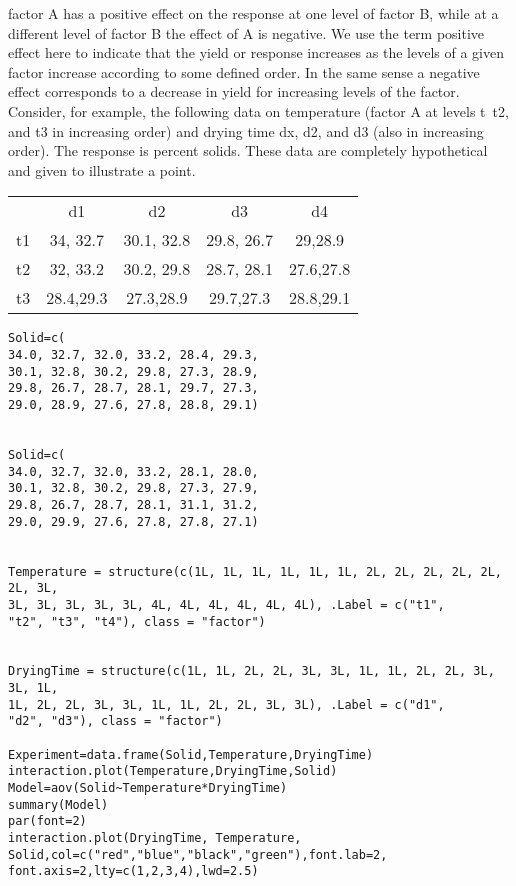 \documentclass{article}
\begin{document}
factor A has a positive effect on the
response at one level of factor B, while at a different level of factor B the effect of
A is negative. We use the term positive effect here to indicate that the yield or
response increases as the levels of a given factor increase according to some defined
order. In the same sense a negative effect corresponds to a decrease in yield for
increasing levels of the factor.
Consider, for example, the following data on temperature (factor A at levels t\,
t2, and t3 in increasing order) and drying time dx, d2, and d3 (also in increasing
order). The response is percent solids. These data are completely hypothetical
and given to illustrate a point.

\begin{tabular}{|c|c|c|c|c|}
\hline

& d1 &	d2	&	d3	& d4	 \\
t1 & 34, 32.7 &	30.1, 32.8	&	29.8, 26.7	&	29,28.9	 \\
t2 & 32, 33.2 &	30.2, 29.8	&	28.7, 28.1	&	27.6,27.8	\\
t3 & 28.4,29.3	&	27.3,28.9	&	29.7,27.3	&	28.8,29.1	\\

\hline 
\end{tabular} 

\begin{verbatim}
Solid=c(
34.0, 32.7, 32.0, 33.2, 28.4, 29.3, 
30.1, 32.8, 30.2, 29.8, 27.3, 28.9, 
29.8, 26.7, 28.7, 28.1, 29.7, 27.3, 
29.0, 28.9, 27.6, 27.8, 28.8, 29.1)


Solid=c(
34.0, 32.7, 32.0, 33.2, 28.1, 28.0, 
30.1, 32.8, 30.2, 29.8, 27.3, 27.9, 
29.8, 26.7, 28.7, 28.1, 31.1, 31.2, 
29.0, 29.9, 27.6, 27.8, 27.8, 27.1)


Temperature = structure(c(1L, 1L, 1L, 1L, 1L, 1L, 2L, 2L, 2L, 2L, 2L, 2L, 3L, 
3L, 3L, 3L, 3L, 3L, 4L, 4L, 4L, 4L, 4L, 4L), .Label = c("t1", 
"t2", "t3", "t4"), class = "factor")


DryingTime = structure(c(1L, 1L, 2L, 2L, 3L, 3L, 1L, 1L, 2L, 2L, 3L, 3L, 1L, 
1L, 2L, 2L, 3L, 3L, 1L, 1L, 2L, 2L, 3L, 3L), .Label = c("d1", 
"d2", "d3"), class = "factor")

Experiment=data.frame(Solid,Temperature,DryingTime)
interaction.plot(Temperature,DryingTime,Solid)
Model=aov(Solid~Temperature*DryingTime)
summary(Model)
par(font=2)
interaction.plot(DryingTime, Temperature, Solid,col=c("red","blue","black","green"),font.lab=2,
font.axis=2,lty=c(1,2,3,4),lwd=2.5)
\end{verbatim}
\end{document}
